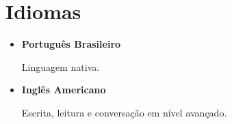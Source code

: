 \section{Idiomas}

\begin{itemize}
  \item \textbf{Português Brasileiro}

		Linguagem nativa.

  \item \textbf{Inglês Americano}

		Escrita, leitura e conversação em nível avançado.

\end{itemize}
